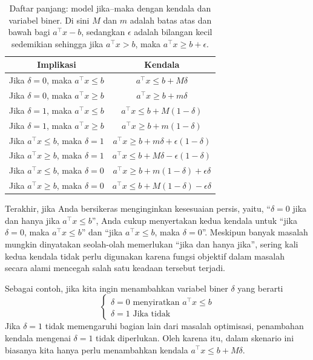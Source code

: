 \begin{table}
\begin{center}
\begin{tabular}{|c|c|}
\hline
\textbf{Implikasi} & \textbf{Kendala}\\
\hline
Jika $\delta = 0$, maka $a^\top x \leq b$ & $a^\top x \leq b + M \delta$\\
Jika $\delta = 0$, maka $a^\top x \geq b$ & $a^\top x \geq b + m \delta$\\
Jika $\delta = 1$, maka $a^\top x \leq b$ & $a^\top x \leq b + M (1-\delta)$\\
Jika $\delta = 1$, maka $a^\top x \geq b$ & $a^\top x \geq b + m (1-\delta)$\\
Jika $a^\top x \leq b$, maka $\delta = 1$ & $a^\top x \geq b + m \delta + \epsilon(1-\delta)$\\
Jika $a^\top x \geq b$, maka $\delta = 1$ & $a^\top x \leq b + M \delta - \epsilon(1-\delta)$\\
Jika $a^\top x \leq b$, maka $\delta = 0$ & $a^\top x \geq b + m (1-\delta) + \epsilon \delta$\\
Jika $a^\top x \geq b$, maka $\delta = 0$ & $a^\top x \leq b + M (1-\delta) - \epsilon \delta$\\
\hline
\end{tabular}
\end{center}
\caption{Daftar panjang: model jika--maka dengan kendala dan variabel biner. Di sini $M$ dan $m$ adalah batas atas dan bawah bagi $a^\top x - b$, sedangkan $\epsilon$ adalah bilangan kecil sedemikian sehingga jika $a^\top x > b$, maka $a^\top x \geq b + \epsilon$.}
\end{table}
Terakhir, jika Anda bersikeras menginginkan kesesuaian persis, yaitu, ``$\delta = 0 $ jika dan hanya jika $a^\top x \leq b$'', Anda cukup menyertakan kedua kendala untuk ``jika $\delta = 0 $, maka $a^\top x \leq b$'' dan ``jika $a^\top x \leq b$, maka $\delta = 0 $''. Meskipun banyak masalah mungkin dinyatakan seolah-olah memerlukan ``jika dan hanya jika'', sering kali kedua kendala tidak perlu digunakan karena fungsi objektif dalam masalah secara alami mencegah salah satu keadaan tersebut terjadi.

Sebagai contoh, jika kita ingin menambahkan variabel biner $\delta$ yang berarti
$$
\begin{cases}
\delta = 0 \text{ menyiratkan }  a^\top x \leq b\\
\delta = 1  \text{ Jika tidak}
\end{cases}
$$
Jika $\delta = 1$ tidak memengaruhi bagian lain dari masalah optimisasi, penambahan kendala mengenai $\delta = 1$ tidak diperlukan. Oleh karena itu, dalam skenario ini biasanya kita hanya perlu menambahkan kendala $a^\top x \leq b + M \delta$.

